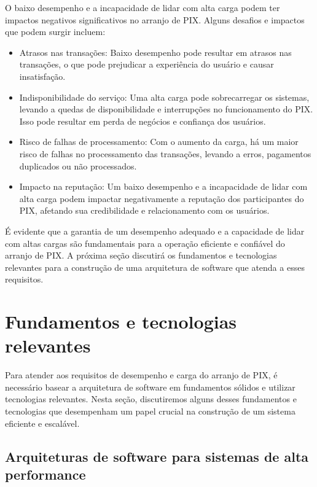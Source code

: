 \documentclass[12pt]{article}
\begin{document}
O baixo desempenho e a incapacidade de lidar com alta carga podem ter impactos negativos significativos no arranjo de PIX. Alguns desafios e impactos que podem surgir incluem:
\begin{itemize}

\item Atrasos nas transações: Baixo desempenho pode resultar em atrasos nas transações, o que pode prejudicar a experiência do usuário e causar insatisfação.

\item Indisponibilidade do serviço: Uma alta carga pode sobrecarregar os sistemas, levando a quedas de disponibilidade e interrupções no funcionamento do PIX. Isso pode resultar em perda de negócios e confiança dos usuários.

\item Risco de falhas de processamento: Com o aumento da carga, há um maior risco de falhas no processamento das transações, levando a erros, pagamentos duplicados ou não processados.

\item Impacto na reputação: Um baixo desempenho e a incapacidade de lidar com alta carga podem impactar negativamente a reputação dos participantes do PIX, afetando sua credibilidade e relacionamento com os usuários.
\end{itemize}
É evidente que a garantia de um desempenho adequado e a capacidade de lidar com altas cargas são fundamentais para a operação eficiente e confiável do arranjo de PIX. A próxima seção discutirá os fundamentos e tecnologias relevantes para a construção de uma arquitetura de software que atenda a esses requisitos.

\section{Fundamentos e tecnologias relevantes} \label{sec:tecnologia}

Para atender aos requisitos de desempenho e carga do arranjo de PIX, é necessário basear a arquitetura de software em fundamentos sólidos e utilizar tecnologias relevantes. Nesta seção, discutiremos alguns desses fundamentos e tecnologias que desempenham um papel crucial na construção de um sistema eficiente e escalável.

\subsection{Arquiteturas de software para sistemas de alta performance} \label{sec:tecnologia}
\end{document}

